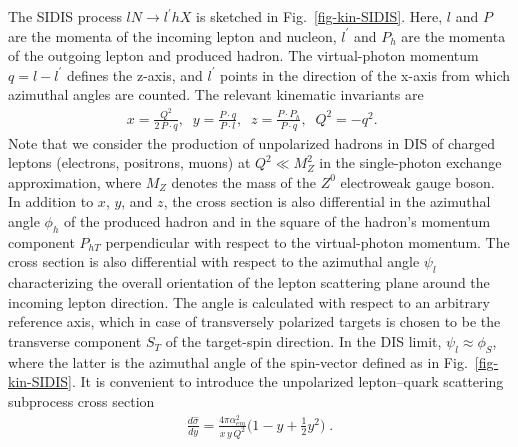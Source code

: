 \documentclass[a4paper,11pt]{article}
\newcommand{\ba}{\begin{eqnarray}}
\newcommand{\ea}{\end{eqnarray}}
\def\Phperp{P_{hT}}
\begin{document}
The SIDIS process  $lN\to l^\prime h X$ is sketched in
Fig.~\ref{fig-kin-SIDIS}. Here, $l$ and $P$ are the momenta of the incoming
lepton and nucleon, $l^\prime$ and $P_h$ are the momenta of the outgoing
lepton and produced hadron. The virtual-photon momentum $q=l-l^\prime$
defines the z-axis, and $l^\prime$ points in the direction of the x-axis
from which azimuthal angles are counted. The relevant kinematic invariants
are
\ba
   x  = \frac{Q^2}{2\,P\cdot  q}, \;\;
   y = \frac{P \cdot  q}{P \cdot  l}, \;\;
   z = \frac{P \cdot  P_h}{P\cdot  q}, \;\;
   Q^2=-q^2.
\label{eq:xyz}\;\;\;\;\ea
Note that we consider the production of unpolarized hadrons in DIS of
charged leptons (electrons, positrons, muons) at $Q^2 \ll M_Z^2$
in the single-photon exchange approximation,
where $M_Z$ denotes the mass of the $Z^0$ electroweak gauge boson.
In addition to $x$, $y$, and $z$, the cross section is also differential
in the azimuthal angle $\phi_h$ of the produced hadron and in the square
of the hadron's momentum component $\Phperp$ perpendicular with respect to the
virtual-photon momentum.  The cross section is also
differential with respect to the azimuthal angle $\psi_l$
 characterizing the overall orientation of the lepton scattering plane
around the incoming lepton direction. The angle is calculated with respect
to an arbitrary reference axis, which in case of transversely polarized
targets is chosen to be the transverse component $S_T$ of the target-spin direction.
In the DIS limit, $\psi_l \approx \phi_S$, where the latter is the azimuthal angle of
the spin-vector defined as in Fig.~\ref{fig-kin-SIDIS}.
It is convenient to introduce the unpolarized
lepton--quark scattering subprocess cross section
\ba\label{Eq:sigma0-FUU}
	\frac{d \hat{\sigma}}{dy}
	=
	\frac{4 \pi \alpha_{em}^2}{x\,y\,Q^2}
	\biggl(1-y+\frac12y^2\biggr)\;.
\ea
\end{document}
